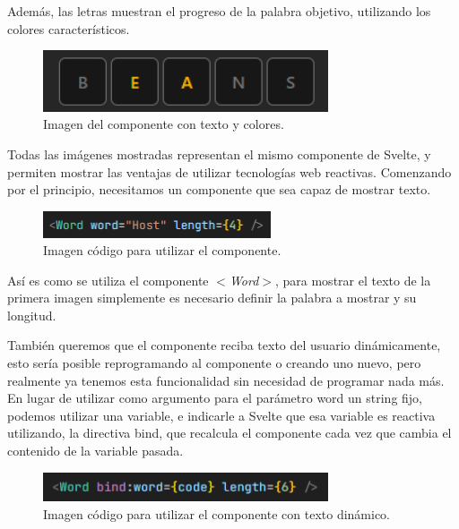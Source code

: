Además, las letras muestran el progreso de la palabra objetivo, utilizando los colores característicos.

\begin{figure}[H]
	\centering
	\includegraphics[clip=true, width=0.75\textwidth]{images/reusing/colored_component.png}
	\caption{Imagen del componente con texto y colores.}
	\label{fig:comp_colored}
\end{figure}

Todas las imágenes mostradas representan el mismo componente de Svelte, y permiten mostrar las ventajas de utilizar tecnologías web reactivas.
Comenzando por el principio, necesitamos un componente que sea capaz de mostrar texto.

\begin{figure}[H]
	\centering
	\includegraphics[clip=true, width=0.6\textwidth]{images/reusing/code_simple_component.png}
	\caption{Imagen código para utilizar el componente.}
	\label{fig:comp_simple_code}
\end{figure}

Así es como se utiliza el componente \textit{$<$Word$>$}, para mostrar el texto de la primera imagen simplemente es necesario definir la palabra a mostrar y su longitud.

También queremos que el componente reciba texto del usuario dinámicamente, esto sería posible reprogramando al componente o creando uno nuevo, pero realmente ya tenemos esta funcionalidad sin necesidad de programar nada más. En lugar de utilizar como argumento para el parámetro word un string fijo, podemos utilizar una variable, e indicarle a Svelte que esa variable es reactiva utilizando, la directiva bind, que recalcula el componente cada vez que cambia el contenido de la variable pasada.

\begin{figure}[H]
	\centering
	\includegraphics[clip=true, width=0.75\textwidth]{images/reusing/code_dyn_component.png}
	\caption{Imagen código para utilizar el componente con texto dinámico.}
	\label{fig:comp_dyn_code}
\end{figure}

